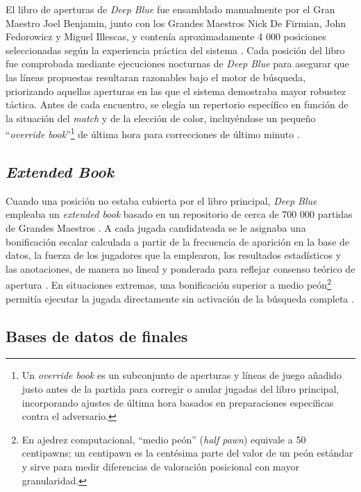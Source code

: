 \documentclass[a4paper, 12pt]{article}
\begin{document}
El libro de aperturas de \textit{Deep Blue} fue ensamblado 
manualmente por el Gran Maestro Joel Benjamin, junto con los 
Grandes Maestros Nick De Firmian, John Fedorowicz y Miguel Illescas, 
y contenía aproximadamente 4 000 posiciones seleccionadas según 
la experiencia práctica del sistema \cite{campbell2002deep}. Cada 
posición del libro fue comprobada mediante ejecuciones nocturnas 
de \textit{Deep Blue} para asegurar que las líneas propuestas 
resultaran razonables bajo el motor de búsqueda, priorizando 
aquellas aperturas en las que el sistema demostraba mayor 
robustez táctica. Antes de cada encuentro, 
se elegía un repertorio específico en función de la situación 
del \emph{match} y de la elección de color, incluyéndose un pequeño 
“\emph{override book}”\footnote{Un \emph{override book} es un 
subconjunto de aperturas y líneas de juego añadido justo antes 
de la partida para corregir o anular jugadas del libro principal, 
incorporando ajustes de última hora basados en preparaciones 
específicas contra el adversario.} 
de última hora para correcciones de último 
minuto \cite{campbell2002deep}.

\subsection{\emph{Extended Book}}

Cuando una posición no estaba cubierta por el libro principal, 
\textit{Deep Blue} empleaba un \emph{extended book} basado en un 
repositorio de cerca de 700 000 partidas de Grandes Maestros 
\cite{campbell2002deep}. A cada jugada candidateada se le asignaba 
una bonificación escalar calculada a partir de la frecuencia de 
aparición en la base de datos, la fuerza de los jugadores que la 
emplearon, los resultados estadísticos y las anotaciones, 
de manera no lineal y ponderada para 
reflejar consenso teórico de apertura \cite{campbell2002deep}. 
En situaciones extremas, una bonificación superior a medio 
peón\footnote{En ajedrez computacional, “medio peón” (\emph{half pawn}) 
equivale a 50 centipawns; un centipawn es la centésima parte 
del valor de un peón estándar y sirve para medir diferencias de 
valoración posicional con mayor granularidad.} 
permitía ejecutar la jugada directamente sin activación de 
la búsqueda completa \cite{campbell2002deep}.

\subsection{Bases de datos de finales}
\end{document}
